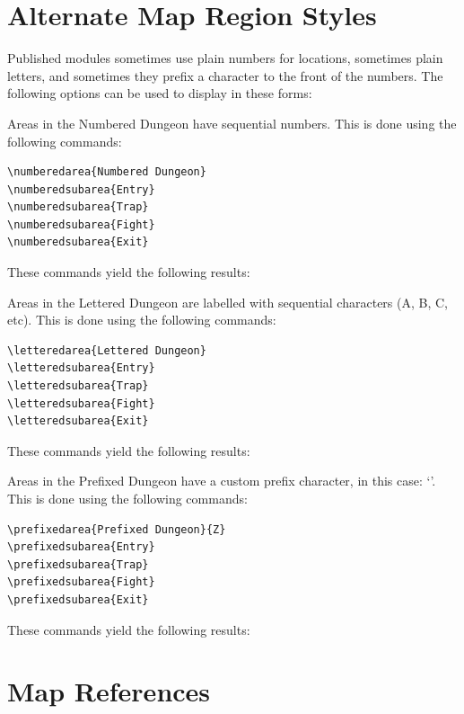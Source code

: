 \documentclass[letterpaper,twocolumn,openany,nodeprecatedcode]{dndbook}
\begin{document}
\section{Alternate Map Region Styles}
Published modules sometimes use plain numbers for locations, sometimes plain
letters, and sometimes they prefix a character to the front of the numbers.
The following options can be used to display in these forms:

Areas in the Numbered Dungeon have sequential numbers. This is done using
the following commands:

\begin{verbatim}
\numberedarea{Numbered Dungeon}
\numberedsubarea{Entry}
\numberedsubarea{Trap}
\numberedsubarea{Fight}
\numberedsubarea{Exit}
\end{verbatim}

These commands yield the following results:

Areas in the Lettered Dungeon are labelled with sequential characters
(A, B, C, etc). This is done using the following commands:

\begin{verbatim}
\letteredarea{Lettered Dungeon}
\letteredsubarea{Entry}
\letteredsubarea{Trap}
\letteredsubarea{Fight}
\letteredsubarea{Exit}
\end{verbatim}

These commands yield the following results:

Areas in the Prefixed Dungeon have a custom prefix character,
in this case: `\prefixedareaprefix'.
This is done using the following commands:

\begin{verbatim}
\prefixedarea{Prefixed Dungeon}{Z}
\prefixedsubarea{Entry}
\prefixedsubarea{Trap}
\prefixedsubarea{Fight}
\prefixedsubarea{Exit}
\end{verbatim}

These commands yield the following results:

\section{Map References}
\end{document}
